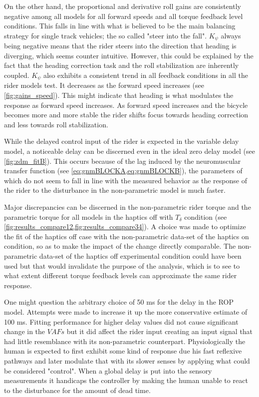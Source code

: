 On the other hand, the proportional and derivative roll gains  are consistently negative among all models for all forward speeds and all torque feedback level conditions. This falls in line with what is believed to be the main balancing strategy for single track vehicles; the so called "steer into the fall". \ensuremath{K_\psi} always being negative means that the rider steers into the direction that heading is diverging, which  seems counter intuitive. However, this could be explained by the fact that the heading correction task and the roll stabilization are inherently coupled. \ensuremath{K_\psi} also exhibits a  consistent trend in all feedback conditions in all the rider models test. It decreases as the forward speed increases (see \cref{fig:gains_speed}). This might indicate that heading is what modulates the response as forward speed increases. As forward speed increases and the bicycle becomes more and more stable the rider shifts focus towards heading correction and less towards roll stabilization. 

While the delayed control input  of the rider is expected in the variable delay model, a noticeable delay can be discerned even in the ideal zero delay model (see \cref{fig:zdm_fitB}). This occurs because  of the lag induced by the neuromuscular transfer function (see \cref{eq:gnmBLOCKA,eq:gnmBLOCKB}), the parameters of which do not seem to fall in line with the measured behavior as the response of the rider to the disturbance in the non-parametric model is much faster. 

Major discrepancies can be discerned in the non-parametric rider torque and the parametric torque for all models in the haptics off with \ensuremath{T_\delta} condition (see \cref{fig:results_compare12,fig:results_compare34}). A choice was made to optimize the fit of the haptics off case with the non-parametric data-set of the haptics on condition, so as to make the impact of the change directly comparable. The non-parametric data-set of the haptics off experimental condition could have been used but that would invalidate the  purpose of the analysis, which is to see to what extent different torque feedback levels can approximate the same rider response. 

One might question the arbitrary choice of 50 \si{\milli\second} for the delay in the ROP model. Attempts were made to increase it  up the more conservative estimate of 100 \si{\milli\second}. Fitting performance for higher delay values did not cause significant change in the \ensuremath{\mathit{VAF}s} but it did affect the rider input creating an input signal that had little resemblance with its non-parametric counterpart.   Physiologically the human is expected to first exhibit some kind of response due his fast reflexive pathways and later modulate that with its slower senses by applying what could be considered "control". When a  global delay is put into the sensory measurements it handicaps the controller by making the human unable to react to the disturbance for the amount of dead time.



